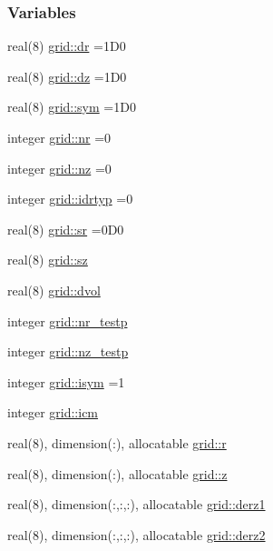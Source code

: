 \subsubsection*{Variables}
\begin{DoxyCompactItemize}
\item 
real(8) \hyperlink{namespacegrid_a1baa9e0cda2fabdcf3c692417f51cb99}{grid\+::dr} =1\+D0
\item 
real(8) \hyperlink{namespacegrid_af2dd57b4230bb5691266889f867fc507}{grid\+::dz} =1\+D0
\item 
real(8) \hyperlink{namespacegrid_a5da7a7ed94ce1ad125820c9e731998ab}{grid\+::sym} =1\+D0
\item 
integer \hyperlink{namespacegrid_adcf6fea7f9e201561e68a1d7c04421c5}{grid\+::nr} =0
\item 
integer \hyperlink{namespacegrid_ac1e240a950d37771ad366b8b12b3743e}{grid\+::nz} =0
\item 
integer \hyperlink{namespacegrid_adb8ca41499ab74560e9d97f2511f2cc4}{grid\+::idrtyp} =0
\item 
real(8) \hyperlink{namespacegrid_ac01da4440df8a87994cbe84c6fe756b1}{grid\+::sr} =0\+D0
\item 
real(8) \hyperlink{namespacegrid_a1368c70ae54f199b68ccfa8672252bf9}{grid\+::sz}
\item 
real(8) \hyperlink{namespacegrid_a45853148f801057061a76070e2969573}{grid\+::dvol}
\item 
integer \hyperlink{namespacegrid_af1ff96c4459cb5671a60fe70e6ce6a3e}{grid\+::nr\+\_\+testp}
\item 
integer \hyperlink{namespacegrid_a8beb75ae0c827f8dea414882ff08e037}{grid\+::nz\+\_\+testp}
\item 
integer \hyperlink{namespacegrid_a2aa66619046d86914292b3e3826e6149}{grid\+::isym} =1
\item 
integer \hyperlink{namespacegrid_aa34e25e6540e6c8bee7767d3bcf0bdee}{grid\+::icm}
\item 
real(8), dimension(\+:), allocatable \hyperlink{namespacegrid_a179734537d519e50cb4330f69282778c}{grid\+::r}
\item 
real(8), dimension(\+:), allocatable \hyperlink{namespacegrid_a70452110896f967bfa9712b77c0bd3de}{grid\+::z}
\item 
real(8), dimension(\+:,\+:,\+:), allocatable \hyperlink{namespacegrid_a16bcad48837c65e5d97745b347cafefc}{grid\+::derz1}
\item 
real(8), dimension(\+:,\+:,\+:), allocatable \hyperlink{namespacegrid_a524a0741df0c2d7298368fad8a95f621}{grid\+::derz2}

\end{DoxyCompactItemize}
